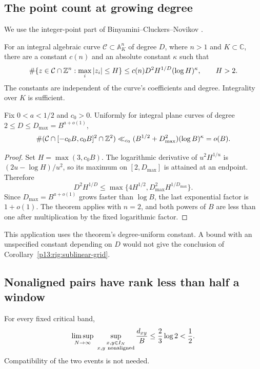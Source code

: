 \subsection{The point count at growing degree}

We use the integer-point part of Binyamini--Cluckers--Novikov
\cite[Theorem~2, equation~(27), in the specified author
version]{binyaminicluckersnovikov2024}.

\begin{theorem}
\label{p13:rig:bcn}
For an integral algebraic curve $\mathcal C\subset\mathbb A^n_K$
of degree $D$, where $n>1$ and $K\subset\mathbb C$, there are
a constant $c(n)$ and an absolute constant $\kappa$ such that
\[
 \#\{z\in\mathcal C\cap\mathbb Z^n:\max_i|z_i|\le H\}
       \le c(n)D^2H^{1/D}(\log H)^\kappa,
       \qquad H>2.
\]
The constants are independent of the curve's coefficients
and degree.  Integrality over $K$ is sufficient.
\end{theorem}

\begin{corollary}
\label{p13:rig:sublinear-grid}
Fix $0<a<1/2$ and $c_0>0$.  Uniformly for integral plane
curves of degree $2\le D\le D_{\max}=B^{a+o(1)}$,
\[
 \#(\mathcal C\cap[-c_0B,c_0B]^2\cap\mathbb Z^2)
 \ll_{c_0}(B^{1/2}+D_{\max}^2)(\log B)^\kappa=o(B).
\]
\end{corollary}

\begin{proof}
Set $H=\max(3,c_0B)$.  The logarithmic derivative of
$u^2H^{1/u}$ is $(2u-\log H)/u^2$, so its maximum on
$[2,D_{\max}]$ is attained at an endpoint.  Therefore
\[
 D^2H^{1/D}\le
 \max\{4H^{1/2},D_{\max}^2H^{1/D_{\max}}\}.
\]
Since $D_{\max}=B^{a+o(1)}$ grows faster than $\log B$,
the last exponential factor is $1+o(1)$.
The theorem applies with $n=2$, and both powers of $B$
are less than one after multiplication by the fixed
logarithmic factor.
\end{proof}

This application uses the theorem's degree-uniform constant.
A bound with an unspecified constant depending on $D$ would
not give the conclusion of Corollary~\ref{p13:rig:sublinear-grid}.

\subsection{Nonaligned pairs have rank less than half a window}

\begin{theorem}
\label{p13:rig:nonaligned}
For every fixed critical band,
\begin{equation}
 \limsup_{N\to\infty}\ 
 \sup_{\substack{x,y\in I_N\\x,y\ {\rm nonaligned}}}
             \frac{d_{xy}}B
       \le\frac23\log2<\frac12.
 \label{p13:rig:nonaligned-bound}
\end{equation}
Compatibility of the two events is not needed.
\end{theorem}

